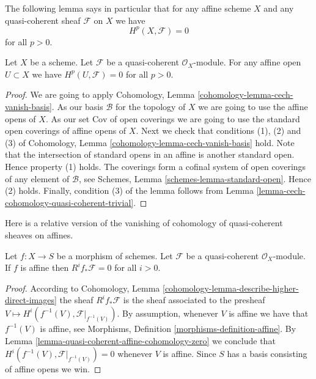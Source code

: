 \noindent
The following lemma says in particular that for any affine scheme
$X$ and any quasi-coherent sheaf $\mathcal{F}$ on $X$ we have
$$
H^p(X, \mathcal{F}) = 0
$$
for all $p > 0$.

\begin{lemma}
\label{lemma-quasi-coherent-affine-cohomology-zero}
Let $X$ be a scheme.
Let $\mathcal{F}$ be a quasi-coherent $\mathcal{O}_X$-module.
For any affine open $U \subset X$ we have
$H^p(U, \mathcal{F}) = 0$ for all $p > 0$.
\end{lemma}

\begin{proof}
We are going to apply
Cohomology, Lemma \ref{cohomology-lemma-cech-vanish-basis}.
As our basis $\mathcal{B}$ for the topology of $X$ we are going to use
the affine opens of $X$.
As our set $\text{Cov}$ of open coverings we are going to use the standard
open coverings of affine opens of $X$.
Next we check that conditions (1), (2) and (3) of
Cohomology, Lemma \ref{cohomology-lemma-cech-vanish-basis}
hold. Note that the intersection of standard opens in an affine is
another standard open. Hence property (1) holds.
The coverings form a cofinal system of open coverings of any element
of $\mathcal{B}$, see
Schemes, Lemma \ref{schemes-lemma-standard-open}.
Hence (2) holds.
Finally, condition (3) of the lemma follows from
Lemma \ref{lemma-cech-cohomology-quasi-coherent-trivial}.
\end{proof}

\noindent
Here is a relative version of the vanishing of cohomology of quasi-coherent
sheaves on affines.

\begin{lemma}
\label{lemma-relative-affine-vanishing}
Let $f : X \to S$ be a morphism of schemes.
Let $\mathcal{F}$ be a quasi-coherent $\mathcal{O}_X$-module.
If $f$ is affine then $R^if_*\mathcal{F} = 0$ for all $i > 0$.
\end{lemma}

\begin{proof}
According to
Cohomology, Lemma \ref{cohomology-lemma-describe-higher-direct-images}
the sheaf
$R^if_*\mathcal{F}$ is the sheaf associated to the presheaf
$V \mapsto H^i(f^{-1}(V), \mathcal{F}|_{f^{-1}(V)})$.
By assumption, whenever $V$ is affine we have that $f^{-1}(V)$ is
affine, see Morphisms, Definition \ref{morphisms-definition-affine}.
By Lemma \ref{lemma-quasi-coherent-affine-cohomology-zero} we conclude that
$H^i(f^{-1}(V), \mathcal{F}|_{f^{-1}(V)}) = 0$
whenever $V$ is affine. Since $S$ has a basis consisting of affine
opens we win.
\end{proof}

